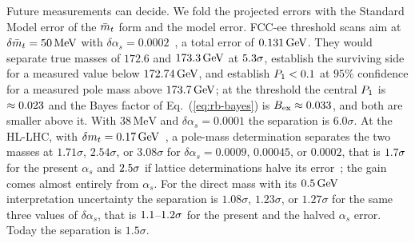 Future measurements can decide.
We fold the projected errors with the Standard Model error of the $\bar m_t$ form and the model error.
FCC-ee threshold scans aim at $\delta\bar m_t=50\,\mathrm{MeV}$ with $\delta\alpha_s=0.0002$~\cite{Freitas:2019bre,FCC:2025lpp}, a total error of $0.131\,\mathrm{GeV}$. %
They would separate true masses of $172.6$ and $173.3\,\mathrm{GeV}$ at $5.3\sigma$, establish the surviving side for a measured value below $172.74\,\mathrm{GeV}$, and establish $P_1<0.1$ at $95\%$ confidence for a measured pole mass above $173.7\,\mathrm{GeV}$; at the threshold the central $P_1$ is $\approx0.023$ and the Bayes factor of Eq.~(\ref{eq:rb-bayes}) is $B_{\rm ex}\approx0.033$, and both are smaller above it. %
With $38\,\mathrm{MeV}$ and $\delta\alpha_s=0.0001$ the separation is $6.0\sigma$. %
At the HL-LHC, with $\delta m_t=0.17\,\mathrm{GeV}$~\cite{Azzi:2019yne}, a pole-mass determination separates the two masses at $1.71\sigma$, $2.54\sigma$, or $3.08\sigma$ for $\delta\alpha_s=0.0009$, $0.00045$, or $0.0002$, that is $1.7\sigma$ for the present $\alpha_s$ and $2.5\sigma$ if lattice determinations halve its error~\cite{FCC:2025lpp}; the gain comes almost entirely from $\alpha_s$. %
For the direct mass with its $0.5\,\mathrm{GeV}$ interpretation uncertainty the separation is $1.08\sigma$, $1.23\sigma$, or $1.27\sigma$ for the same three values of $\delta\alpha_s$, that is $1.1$--$1.2\sigma$ for the present and the halved $\alpha_s$ error. %
Today the separation is $1.5\sigma$. %
